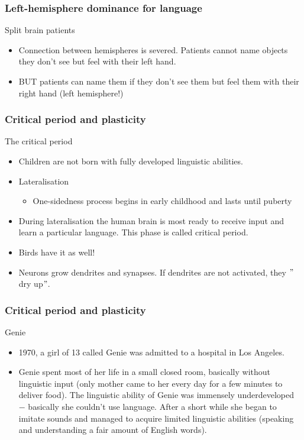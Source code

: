 \documentclass[12pt, table]{beamer}
\begin{document}
\begin{frame}
\frametitle{Left-hemisphere dominance for language}
Split brain patients
\begin{itemize}
\item Connection between hemispheres is severed. Patients cannot name objects they don't see but feel with their left hand. 
\item BUT patients can name them if they don't see them but feel them with their right hand (left hemisphere!)
\end{itemize}
\end{frame}

\begin{frame}
\end{frame}

\begin{frame}
\frametitle{Critical period and plasticity}
The critical period
\begin{itemize}
\item Children are not born with fully developed linguistic abilities.
\item Lateralisation
\begin{itemize}
\item One-sidedness process begins in early childhood and lasts until puberty 
\end{itemize}
\item During lateralisation the human brain is most ready to receive input and learn a particular language. This phase is called critical period.
\item Birds have it as well!
\item Neurons grow dendrites and synapses. If dendrites are not activated, they $"$dry up$"$.
\end{itemize}
\end{frame}

\begin{frame}
\frametitle{Critical period and plasticity}
Genie
\begin{itemize}
\item 1970, a girl of 13 called Genie was admitted to a hospital in Los Angeles.
\item Genie spent most of her life in a small closed room, basically  without linguistic input (only mother came to her every day for a few minutes to deliver food). The linguistic ability of Genie was immensely underdeveloped $-$ basically she couldn't use language. After a short while she began to imitate sounds and managed to acquire limited linguistic abilities (speaking and understanding a fair amount of English words).
\end{itemize}
\end{frame}
\end{document}
